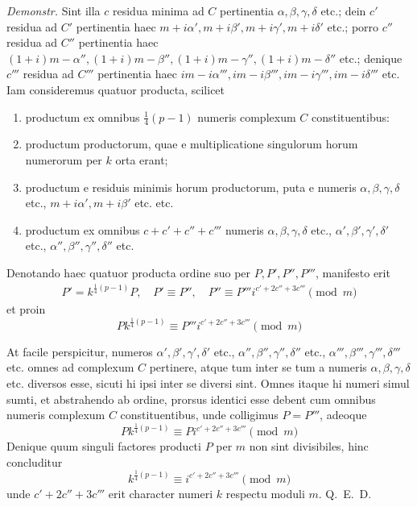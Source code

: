 \emph{Demonstr.} Sint illa $c$ residua minima ad $C$ pertinentia $\alpha,\beta,\gamma,\delta$ etc.; dein $c'$ residua ad $C'$ pertinentia haec $m+i\alpha',m+i\beta',m+i\gamma',m+i\delta'$ etc.; porro $c''$ residua ad $C''$ pertinentia haec $(1+i)m-\alpha'',(1+i)m-\beta'',(1+i)m-\gamma'',(1+i)m-\delta''$ etc.; denique $c'''$ residua ad $C'''$ pertinentia haec $im-i\alpha''',im-i\beta''',im-i\gamma''',im-i\delta'''$ etc. Iam consideremus quatuor producta, scilicet
\begin{enumerate}
\renewcommand{\labelenumi}{\arabic{enumi})}
\item productum ex omnibus $\frac14(p-1)$ numeris complexum $C$ constituentibus:
\item productum productorum, quae e multiplicatione singulorum horum numerorum per $k$ orta erant;
\item productum e residuis minimis horum productorum, puta e numeris $\alpha,\beta,\gamma,\delta$ etc., $m+i\alpha',m+i\beta'$ etc. etc.
\item productum ex omnibus $c+c'+c''+c'''$ numeris $\alpha,\beta,\gamma,\delta$ etc., $\alpha',\beta',\gamma',\delta'$ etc., $\alpha'',\beta'',\gamma'',\delta''$ etc.
\end{enumerate}
Denotando haec quatuor producta ordine suo per $P,P',P'',P'''$, manifesto erit
\[
\begin{gathered}
P'=k^{\frac14(p-1)}P,\quad P'\equiv P'',\quad
P''\equiv P'''i^{c'+2c''+3c'''}\pmod m
\end{gathered}
\]
et proin
\[
Pk^{\frac14(p-1)}\equiv P'''i^{c'+2c''+3c'''}\pmod m
\]

At facile perspicitur, numeros $\alpha',\allowbreak\beta',\allowbreak\gamma',\allowbreak\delta'$ etc., $\alpha'',\allowbreak\beta'',\allowbreak\gamma'',\allowbreak\delta''$ etc., $\alpha''',\allowbreak\beta''',\allowbreak\gamma''',\allowbreak\delta'''$ etc. omnes ad complexum $C$ pertinere, atque tum inter se tum a numeris $\alpha,\allowbreak\beta,\allowbreak\gamma,\allowbreak\delta$ etc. diversos esse, sicuti hi ipsi inter se diversi sint. Omnes itaque hi numeri simul sumti, et abstrahendo ab ordine, prorsus identici esse debent cum omnibus numeris complexum $C$ constituentibus, unde colligimus $P=P'''$, adeoque
\[
Pk^{\frac14(p-1)}\equiv Pi^{c'+2c''+3c'''}\pmod m
\]
Denique quum singuli factores producti $P$ per $m$ non sint divisibiles, hinc concluditur
\[
k^{\frac14(p-1)}\equiv i^{c'+2c''+3c'''}\pmod m
\]
unde $c'+2c''+3c'''$ erit character numeri $k$ respectu moduli $m$. Q.~E.~D.

